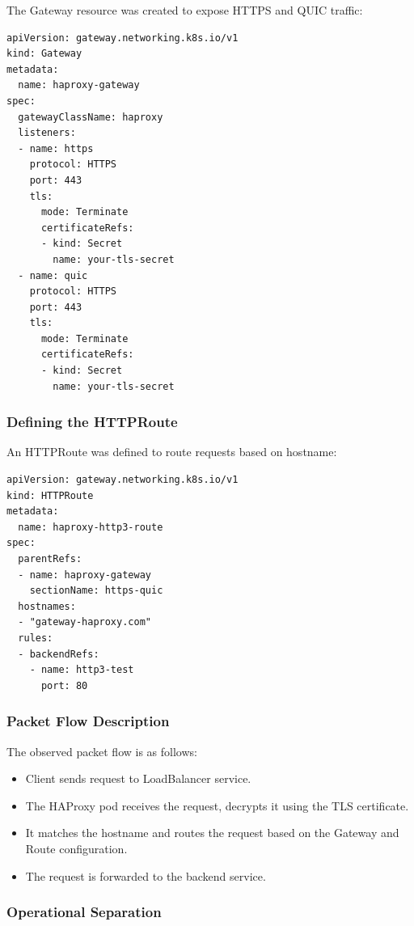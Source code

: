 The Gateway resource was created to expose HTTPS and QUIC traffic:

\begin{lstlisting}[breaklines=true,basicstyle=\small\ttfamily,frame=single]
apiVersion: gateway.networking.k8s.io/v1
kind: Gateway
metadata:
  name: haproxy-gateway
spec:
  gatewayClassName: haproxy
  listeners:
  - name: https
    protocol: HTTPS
    port: 443
    tls:
      mode: Terminate
      certificateRefs:
      - kind: Secret
        name: your-tls-secret
  - name: quic
    protocol: HTTPS
    port: 443
    tls:
      mode: Terminate
      certificateRefs:
      - kind: Secret
        name: your-tls-secret
\end{lstlisting}

\subsubsection{Defining the HTTPRoute}

An HTTPRoute was defined to route requests based on hostname:

\begin{lstlisting}[breaklines=true,basicstyle=\small\ttfamily,frame=single]
apiVersion: gateway.networking.k8s.io/v1
kind: HTTPRoute
metadata:
  name: haproxy-http3-route
spec:
  parentRefs:
  - name: haproxy-gateway
    sectionName: https-quic
  hostnames:
  - "gateway-haproxy.com"
  rules:
  - backendRefs:
    - name: http3-test
      port: 80
\end{lstlisting}

\subsubsection{Packet Flow Description}

The observed packet flow is as follows:

\begin{itemize}
  \item Client sends request to LoadBalancer service.
  \item The HAProxy pod receives the request, decrypts it using the TLS certificate.
  \item It matches the hostname and routes the request based on the Gateway and Route configuration.
  \item The request is forwarded to the backend service.
\end{itemize}

\subsubsection{Operational Separation}

